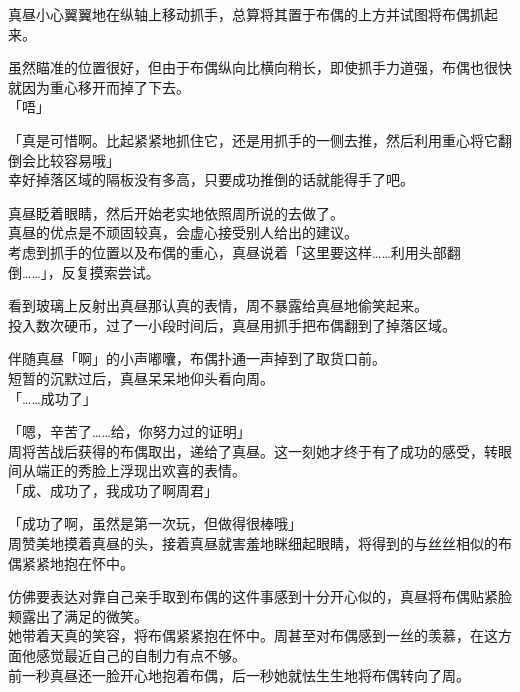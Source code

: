 真昼小心翼翼地在纵轴上移动抓手，总算将其置于布偶的上方并试图将布偶抓起来。

虽然瞄准的位置很好，但由于布偶纵向比横向稍长，即使抓手力道强，布偶也很快就因为重心移开而掉了下去。\\

「唔」

「真是可惜啊。比起紧紧地抓住它，还是用抓手的一侧去推，然后利用重心将它翻倒会比较容易哦」\\

幸好掉落区域的隔板没有多高，只要成功推倒的话就能得手了吧。

真昼眨着眼睛，然后开始老实地依照周所说的去做了。\\

真昼的优点是不顽固较真，会虚心接受别人给出的建议。\\

考虑到抓手的位置以及布偶的重心，真昼说着「这里要这样……利用头部翻倒……」，反复摸索尝试。

看到玻璃上反射出真昼那认真的表情，周不暴露给真昼地偷笑起来。\\

投入数次硬币，过了一小段时间后，真昼用抓手把布偶翻到了掉落区域。

伴随真昼「啊」的小声嘟囔，布偶扑通一声掉到了取货口前。\\

短暂的沉默过后，真昼呆呆地仰头看向周。\\

「……成功了」

「嗯，辛苦了……给，你努力过的证明」\\

周将苦战后获得的布偶取出，递给了真昼。这一刻她才终于有了成功的感受，转眼间从端正的秀脸上浮现出欢喜的表情。\\

「成、成功了，我成功了啊周君」

「成功了啊，虽然是第一次玩，但做得很棒哦」\\

周赞美地摸着真昼的头，接着真昼就害羞地眯细起眼睛，将得到的与丝丝相似的布偶紧紧地抱在怀中。

仿佛要表达对靠自己亲手取到布偶的这件事感到十分开心似的，真昼将布偶贴紧脸颊露出了满足的微笑。\\

她带着天真的笑容，将布偶紧紧抱在怀中。周甚至对布偶感到一丝的羡慕，在这方面他感觉最近自己的自制力有点不够。\\

前一秒真昼还一脸开心地抱着布偶，后一秒她就怯生生地将布偶转向了周。\\

